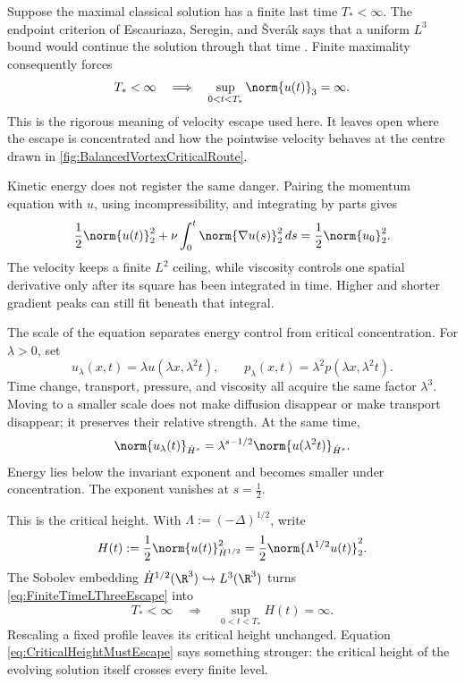 Suppose the maximal classical solution has a finite last time \(T_*<\infty\).
The endpoint criterion of Escauriaza, Seregin, and \v{S}ver\'ak says that a uniform \(L^3\) bound would continue the solution through that time \parencite{EscauriazaSereginSverak2003}.
Finite maximality consequently forces
\begin{equation}\label{eq:FiniteTimeLThreeEscape}
  T_*<\infty
  \quad\Longrightarrow\quad
  \sup_{0<t<T_*}\norm{u(t)}_3=\infty.
\end{equation}
This is the rigorous meaning of velocity escape used here.
It leaves open where the escape is concentrated and how the pointwise velocity behaves at the centre drawn in \cref{fig:BalancedVortexCriticalRoute}.

Kinetic energy does not register the same danger.
Pairing the momentum equation with \(u\), using incompressibility, and integrating by parts gives
\begin{equation}\label{eq:BodyEnergyIdentity}
  \frac12\norm{u(t)}_2^2
  +\nu\int_0^t\norm{\nabla u(s)}_2^2\,ds
  =\frac12\norm{u_0}_2^2.
\end{equation}
The velocity keeps a finite \(L^2\) ceiling, while viscosity controls one spatial derivative only after its square has been integrated in time.
Higher and shorter gradient peaks can still fit beneath that integral.

The scale of the equation separates energy control from critical concentration.
For \(\lambda>0\), set
\[
  u_\lambda(x,t)=\lambda u(\lambda x,\lambda^2t),
  \qquad
  p_\lambda(x,t)=\lambda^2p(\lambda x,\lambda^2t).
\]
Time change, transport, pressure, and viscosity all acquire the same factor \(\lambda^3\).
Moving to a smaller \NavierStokes{} scale does not make diffusion disappear or make transport disappear; it preserves their relative strength.
At the same time,
\[
  \norm{u_\lambda(t)}_{\dot H^s}
  =\lambda^{s-1/2}\norm{u(\lambda^2t)}_{\dot H^s}.
\]
Energy lies below the invariant exponent and becomes smaller under concentration.
The exponent vanishes at \(s=\tfrac12\).

This is the critical height.
With \(\Lambda:=(-\Delta)^{1/2}\), write
\begin{equation}\label{eq:BodyCriticalHeightDefinition}
  H(t)
  :=\frac12\norm{u(t)}_{\dot H^{1/2}}^2
  =\frac12\norm{\Lambda^{1/2}u(t)}_2^2.
\end{equation}
The Sobolev embedding \(\dot H^{1/2}(\R^3)\hookrightarrow L^3(\R^3)\) turns \eqref{eq:FiniteTimeLThreeEscape} into
\begin{equation}\label{eq:CriticalHeightMustEscape}
  T_*<\infty
  \quad\Longrightarrow\quad
  \sup_{0<t<T_*}H(t)=\infty.
\end{equation}
Rescaling a fixed profile leaves its critical height unchanged.
Equation \eqref{eq:CriticalHeightMustEscape} says something stronger: the critical height of the evolving solution itself crosses every finite level.

